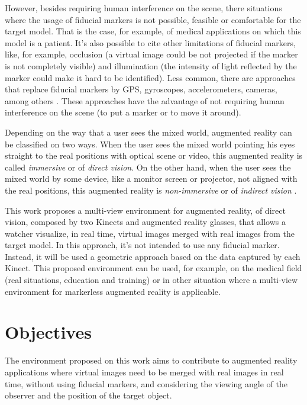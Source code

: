 \documentclass[msc, a4paper, classic, en]{ufbathesis}
\begin{document}
However, besides requiring human interference on the scene, there situations where the usage of fiducial markers is not possible, feasible or comfortable for the target model. That is the case, for example, of medical applications on which this model is a patient. It's also possible to cite other limitations of fiducial markers, like, for example, occlusion (a virtual image could be not projected if the marker is not completely visible) and illumination (the intensity of light reflected by the marker could make it hard to be identified). Less common, there are approaches that replace fiducial markers \cite{6} \cite{7} by GPS, gyroscopes, accelerometers, cameras, among others \cite{3} \cite{8}. These approaches have the advantage of not requiring human interference on the scene (to put a marker or to move it around).

Depending on the way that a user sees the mixed world, augmented reality can be classified on two ways. When the user sees the mixed world pointing his eyes straight to the real positions with optical scene or video, this augmented reality is called \textit{immersive} or of \textit{direct vision}. On the other hand, when the user sees the mixed world by some device, like a monitor screen or projector, not aligned with the real positions, this augmented reality is \textit{non-immersive} or of \textit{indirect vision} \cite{1}.

This work proposes a multi-view environment for augmented reality, of direct vision, composed by two Kinects \cite{43} and augmented reality glasses, that allows a watcher visualize, in real time, virtual images merged with real images from the target model. In this approach, it's not intended to use any fiducial marker. Instead, it will be used a geometric approach based on the data captured by each Kinect. This proposed environment can be used, for example, on the medical field (real situations, education and training) or in other situation where a multi-view environment for markerless augmented reality is applicable. 

\section{Objectives}

The environment proposed on this work aims to contribute to augmented reality applications where virtual images need to be merged with real images in real time, without using fiducial markers, and considering the viewing angle of the observer and the position of the target object.
\end{document}
